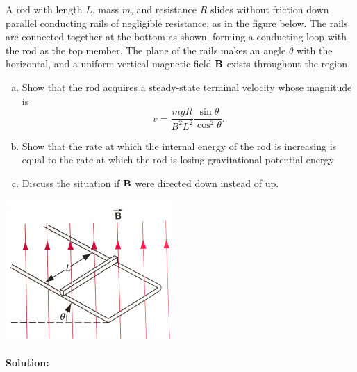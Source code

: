 \documentclass[11pt]{article}
\newcommand{\be}{\begin{enumerate}[a) ]}
\newcommand{\ee}{\end{enumerate}}
\begin{document}
\begin{problem}[\P(P34.9)]
A rod with length $L$, mass $m$, and resistance $R$ slides without friction down parallel conducting
rails of negligible resistance, as in the figure below. The rails are connected together at the bottom as
shown, forming a conducting loop with the rod as the top member. The plane of the rails makes an
angle $\theta$ with the horizontal, and a uniform vertical magnetic field $\mathbf{B}$ exists throughout the region.
\be
\item Show that the rod acquires a steady-state terminal velocity whose magnitude is
\[
	v = \frac{mgR}{B^2L^2}\frac{\sin\theta}{\cos^2\theta}.
\]
\item  Show that the rate at which the internal energy of the rod is increasing is equal to the rate
at which the rod is losing gravitational potential energy
\item  Discuss the situation if $\mathbf{B}$ were directed down instead of up.
\ee
\begin{center}
\includegraphics[scale=0.6]{prob5.png}
\end{center}
\end{problem}


\textbf{Solution:}\\

\clearpage
\end{document}
